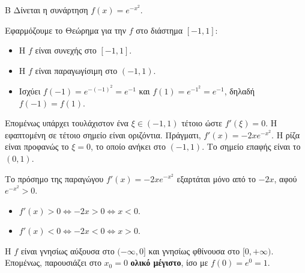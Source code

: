 \begin{thema}{Β}
Δίνεται η συνάρτηση $f(x) = e^{-x^2}$.
\begin{erwthma}
\item Εφαρμόζουμε το Θεώρημα  για την $f$ στο διάστημα $[-1, 1]$:
\begin{itemize}
\item Η $f$ είναι συνεχής στο $[-1, 1]$.
\item Η $f$ είναι παραγωγίσιμη στο $(-1, 1)$.
\item Ισχύει $f(-1) = e^{-(-1)^2} = e^{-1}$ και $f(1) = e^{-1^2} = e^{-1}$, δηλαδή $f(-1) = f(1)$.
\end{itemize}
Επομένως υπάρχει τουλάχιστον ένα $\xi \in (-1, 1)$ τέτοιο ώστε $f'(\xi) = 0$. Η εφαπτομένη σε τέτοιο σημείο είναι οριζόντια.
Πράγματι, $f'(x) = -2x e^{-x^2}$. Η ρίζα είναι προφανώς το $\xi = 0$, το οποίο ανήκει στο $(-1, 1)$. Το σημείο επαφής είναι το $(0, 1)$.

\item Το πρόσημο της παραγώγου $f'(x) = -2x e^{-x^2}$ εξαρτάται μόνο από το $-2x$, αφού $e^{-x^2} > 0$.
\begin{itemize}
\item $f'(x) > 0 \Leftrightarrow -2x > 0 \Leftrightarrow x < 0$.
\item $f'(x) < 0 \Leftrightarrow -2x < 0 \Leftrightarrow x > 0$.
\end{itemize}
\begin{center}
\end{center}
Η $f$ είναι γνησίως αύξουσα στο $(-\infty, 0]$ και γνησίως φθίνουσα στο $[0, +\infty)$.
Επομένως, παρουσιάζει στο $x_0 = 0$ \textbf{ολικό μέγιστο}, ίσο με $f(0) = e^0 = 1$.


\end{erwthma}
\end{thema}
